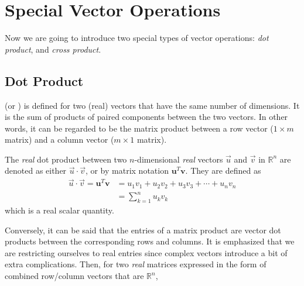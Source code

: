 \section{Special Vector Operations}
\label{section:vectorops}
Now we are going to introduce two special types of vector operations: \textit{dot product}, and \textit{cross product}. 

\subsection{Dot Product}
\label{section:dotprod}
 (or ) is defined for two (real) vectors that have the same number of dimensions. It is the sum of products of paired components between the two vectors. In other words, it can be regarded to be the matrix product between a row vector ($1 \times m$ matrix) and a column vector ($m \times 1$ matrix). 
\begin{defn}
\label{defn:dotreal}
The \textit{real} dot product between two $n$-dimensional \textit{real} vectors $\vec{u}$ and $\vec{v}$ in $\mathbb{R}^n$ are denoted as either $\vec{u} \cdot \vec{v}$, or by matrix notation $\textbf{u}^T\textbf{v}$. They are defined as
\begin{subequations}
\label{eqn:dotreal}
\begin{align}
\vec{u} \cdot \vec{v} = \textbf{u}^T\textbf{v} &= u_1v_1 + u_2v_2 + u_3v_3 + \cdots + u_nv_n \\
&= \sum_{k=1}^{n} u_kv_k 
\end{align}    
\end{subequations}
which is a real scalar quantity.
\end{defn}
Conversely, it can be said that the entries of a matrix product are vector dot products between the corresponding rows and columns. It is emphasized that we are restricting ourselves to real entries since complex vectors introduce a bit of extra complications. Then, for two \textit{real} matrices expressed in the form of combined row/column vectors that are $\mathbb{R}^n$,

